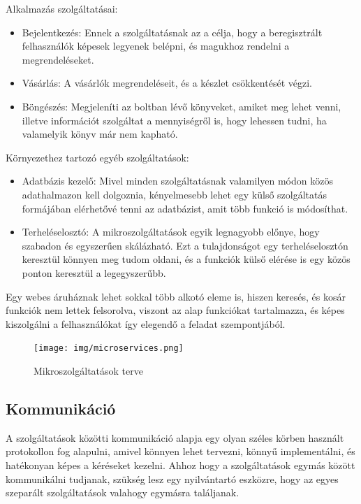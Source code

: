 \documentclass[11pt,magyar,a4paper,twoside,]{report}
\providecommand{\tightlist}{%
  \setlength{\itemsep}{0pt}\setlength{\parskip}{0pt}}
\begin{document}
Alkalmazás szolgáltatásai:

\begin{itemize}
\tightlist
\item
  Bejelentkezés: Ennek a szolgáltatásnak az a célja, hogy a
  beregisztrált felhasználók képesek legyenek belépni, és magukhoz
  rendelni a megrendeléseket.
\item
  Vásárlás: A vásárlók megrendeléseit, és a készlet csökkentését végzi.
\item
  Böngészés: Megjeleníti az boltban lévő könyveket, amiket meg lehet
  venni, illetve információt szolgáltat a mennyiségről is, hogy lehessen
  tudni, ha valamelyik könyv már nem kapható.
\end{itemize}

Környezethez tartozó egyéb szolgáltatások:

\begin{itemize}
\tightlist
\item
  Adatbázis kezelő: Mivel minden szolgáltatásnak valamilyen módon közös
  adathalmazon kell dolgoznia, kényelmesebb lehet egy külső szolgáltatás
  formájában elérhetővé tenni az adatbázist, amit több funkció is
  módosíthat.
\item
  Terheléselosztó: A mikroszolgáltatások egyik legnagyobb előnye, hogy
  szabadon és egyszerűen skálázható. Ezt a tulajdonságot egy
  terheléselosztón keresztül könnyen meg tudom oldani, és a funkciók
  külső elérése is egy közös ponton keresztül a legegyszerűbb.
\end{itemize}

Egy webes áruháznak lehet sokkal több alkotó eleme is, hiszen keresés,
és kosár funkciók nem lettek felsorolva, viszont az alap funkciókat
tartalmazza, és képes kiszolgálni a felhasználókat így elegendő a
feladat szempontjából.

\begin{figure}[H]
\centering
\texttt{[image: img/microservices.png]}
\caption{Mikroszolgáltatások terve}
\end{figure}

\subsection{Kommunikáció}\label{kommunikuxe1ciuxf3}

A szolgáltatások közötti kommunikáció alapja egy olyan széles körben
használt protokollon fog alapulni, amivel könnyen lehet tervezni, könnyű
implementálni, és hatékonyan képes a kéréseket kezelni. Ahhoz hogy a
szolgáltatások egymás között kommunikálni tudjanak, szükség lesz egy
nyilvántartó eszközre, hogy az egyes szeparált szolgáltatások valahogy
egymásra találjanak.
\end{document}
